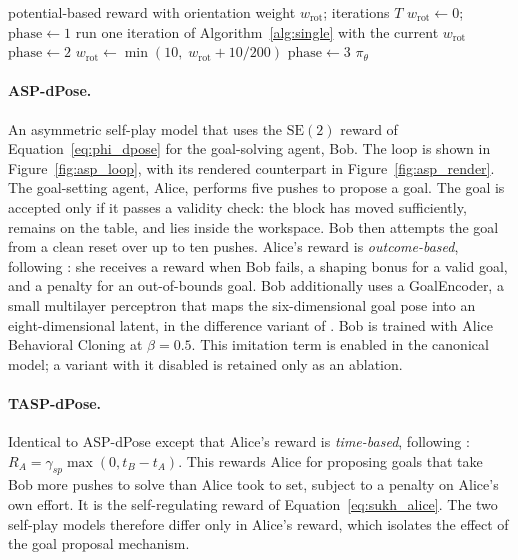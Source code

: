 \begin{algorithm}[H]
\caption{Forced curriculum staging (PPO-Curriculum).}
\label{alg:curriculum}
\begin{algorithmic}[1]
\Require potential-based reward with orientation weight $w_{\text{rot}}$; iterations $T$
\State $w_{\text{rot}} \gets 0$; $\text{phase} \gets 1$ 
    \State run one iteration of Algorithm~\ref{alg:single} with the current $w_{\text{rot}}$
        \State $\text{phase} \gets 2$ 
    \EndIf
        \State $w_{\text{rot}} \gets \min(10,\; w_{\text{rot}} + 10/200)$
            \State $\text{phase} \gets 3$ 
        \EndIf
    \EndIf
\EndFor
\State \Return $\pi_\theta$
\end{algorithmic}
\end{algorithm}

\paragraph{ASP-dPose.}
An asymmetric self-play model that uses the $\mathrm{SE}(2)$ reward of
Equation~\ref{eq:phi_dpose} for the goal-solving agent, Bob. The loop is shown in
Figure~\ref{fig:asp_loop}, with its rendered counterpart in
Figure~\ref{fig:asp_render}. The goal-setting agent, Alice, performs five pushes to
propose a goal. The goal is accepted only if it passes a validity check: the block
has moved sufficiently, remains on the table, and lies inside the workspace. Bob
then attempts the goal from a clean reset over up to ten pushes. Alice's reward is
\emph{outcome-based}, following \cite{OpenAI2021AsymmetricSF}: she receives a
reward when Bob fails, a shaping bonus for a valid goal, and a penalty for an
out-of-bounds goal. Bob additionally uses a GoalEncoder, a small multilayer
perceptron that maps the six-dimensional goal pose into an eight-dimensional
latent, in the difference variant of \cite{Sukhbaatar2018GoalEmbeddings}. Bob is
trained with Alice Behavioral Cloning at $\beta = 0.5$. This imitation term is
enabled in the canonical model; a variant with it disabled is retained only as an
ablation.

\paragraph{TASP-dPose.}
Identical to ASP-dPose except that Alice's reward is \emph{time-based}, following
\cite{Sukhbaatar2018IntrinsicMotivation}: $R_A = \gamma_{sp}\max(0, t_B - t_A)$.
This rewards Alice for proposing goals that take Bob more pushes to solve than
Alice took to set, subject to a penalty on Alice's own effort. It is the
self-regulating reward of Equation~\ref{eq:sukh_alice}. The two self-play models
therefore differ only in Alice's reward, which isolates the effect of the goal
proposal mechanism.

